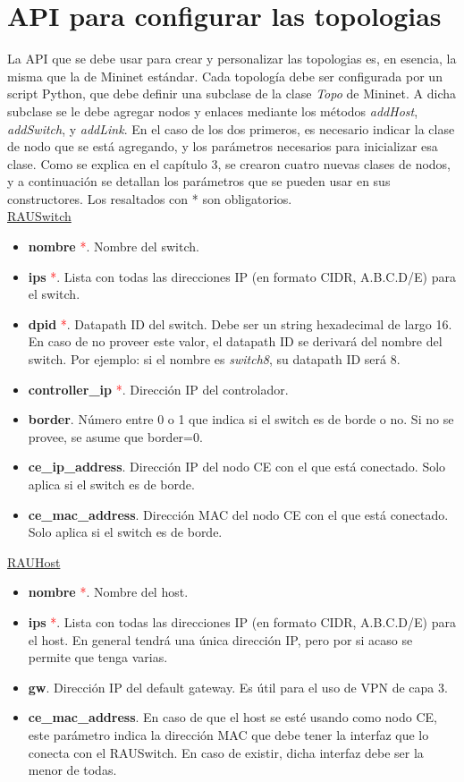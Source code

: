 \section{API para configurar las topologias}
La API que se debe usar para crear y personalizar las topologias es, en esencia, la misma que la de Mininet estándar. Cada topología debe ser configurada por un script Python, que debe definir una subclase de la clase \textit{Topo} de Mininet. A dicha subclase se le debe agregar nodos y enlaces mediante los métodos \textit{addHost}, \textit{addSwitch}, y \textit{addLink}. En el caso de los dos primeros, es necesario indicar la clase de nodo que se está agregando, y los parámetros necesarios para inicializar esa clase. Como se explica en el capítulo 3, se crearon cuatro nuevas clases de nodos, y a continuación se detallan los parámetros que se pueden usar en sus constructores. Los resaltados con * son obligatorios. \\

\underline{RAUSwitch}
\begin{itemize}
	\item \textbf{nombre} \textcolor{red}{*}. Nombre del switch.
	\item \textbf{ips} \textcolor{red}{*}. Lista con todas las direcciones IP (en formato CIDR, A.B.C.D/E) para el switch.
	\item \textbf{dpid} \textcolor{red}{*}. Datapath ID del switch. Debe ser un string hexadecimal de largo 16. En caso de no proveer este valor, el datapath ID se derivará del nombre del switch. Por ejemplo: si el nombre es \textit{switch8}, su datapath ID será 8.
	\item \textbf{controller\_ip} \textcolor{red}{*}. Dirección IP del controlador.
	\item \textbf{border}. Número entre 0 o 1 que indica si el switch es de borde o no. Si no se provee, se asume que border=0.
	\item \textbf{ce\_ip\_address}. Dirección IP del nodo CE con el que está conectado. Solo aplica si el switch es de borde.
	\item \textbf{ce\_mac\_address}. Dirección MAC del nodo CE con el que está conectado. Solo aplica si el switch es de borde.
\end{itemize}

\underline{RAUHost}

\begin{itemize}
	\item \textbf{nombre} \textcolor{red}{*}. Nombre del host.
	\item \textbf{ips} \textcolor{red}{*}. Lista con todas las direcciones IP (en formato CIDR, A.B.C.D/E) para el host. En general tendrá una única dirección IP, pero por si acaso se permite que tenga varias.
	\item \textbf{gw}.  Dirección IP del default gateway. Es útil para el uso de VPN de capa 3.
	\item \textbf{ce\_mac\_address}. En caso de que el host se esté usando como nodo CE, este parámetro indica la dirección MAC que debe tener la interfaz que lo conecta con el RAUSwitch. En caso de existir, dicha interfaz debe ser la menor de todas.
\end{itemize}

